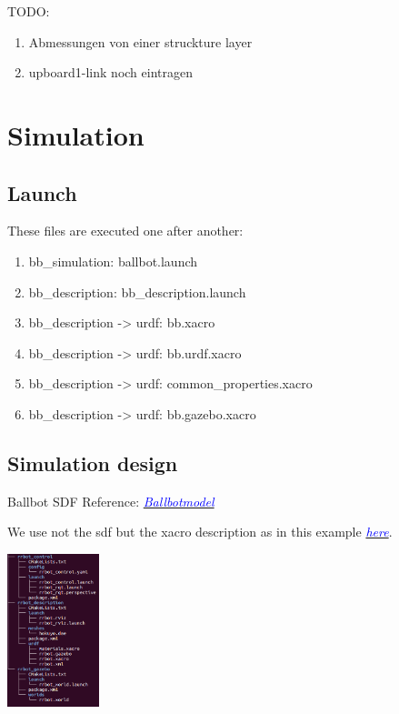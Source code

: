 \documentclass[twoside,colorback,accentcolor=tud4c,11pt]{tudreport}
\newcommand{\mylink}[2] {	\hyperlink{#1}{	\textit{\textcolor{blue}{#2}}}}
\begin{document}
TODO:\\
\begin{enumerate}
	\item Abmessungen von einer struckture layer
	\item upboard1-link noch eintragen
\end{enumerate}

\chapter{Simulation}

\section{Launch}
These files are executed one after another:
\begin{enumerate}
	\item bb\_simulation: ballbot.launch
	\item bb\_description: bb\_description.launch
	\item bb\_description -> urdf: bb.xacro
	\item bb\_description -> urdf: bb.urdf.xacro
	\item bb\_description -> urdf: common\_properties.xacro
	\item bb\_description -> urdf: bb.gazebo.xacro
\end{enumerate}

\section{Simulation design}

Ballbot SDF Reference:
\mylink{https://bitbucket.org/osrf/gazebo/issues/2335/how-to-set-the-friction-of-ballbot-the}{Ballbotmodel} 

We use not the sdf but the xacro description as in this example \mylink{http://gazebosim.org/tutorials/?tut=ros_urdf}{here}.

\begin{center}
		\includegraphics[width=0.2\textwidth]{img/filestructure.png} 
\end{center}
\end{document}
